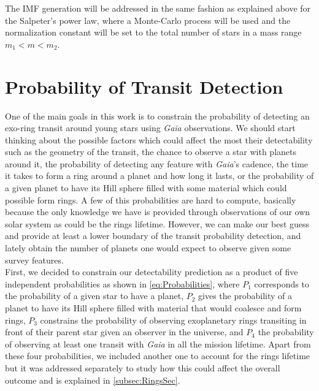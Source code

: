 The IMF generation will be addressed in the same fashion as explained above for the Salpeter's power law, where a Monte-Carlo process will be used and the normalization constant will be set to the total number of stars in a mass range $m_1 < m < m_2$. 

\section{Probability of Transit Detection}


One of the main goals in this work is to constrain the probability of detecting an exo-ring transit around young stars using \textit{Gaia} observations. We should start thinking about the possible factors which could affect the most their detectability such as the geometry of the transit, the chance to observe a star with planets around it, the probability of detecting any feature with \textit{Gaia}'s cadence, the time it takes to form a ring around a planet and how long it lasts, or the probability of a given planet to have its Hill sphere filled with some material which could possible form rings. A few of this probabilities are hard to compute, basically because the only knowledge we have is provided through observations of our own solar system as could be the rings lifetime. However, we can make our best guess and provide at least a lower boundary of the transit probability detection, and lately obtain the number of planets one would expect to observe given some survey features.\\

First, we decided to constrain our detectability prediction as a product of five independent probabilities  as shown in \autoref{eq:Probabilities}, where $P_1$ corresponds to the probability of a given star to have a planet, $P_2$ gives the probability of a planet to have its Hill sphere filled with material that would coalesce and form rings, $P_3$ constrains the probability of observing exoplanetary rings transiting in front of their parent star given an observer in the universe, and $P_4$ the probability of observing at least one transit with \textit{Gaia} in all the mission lifetime. Apart from these four probabilities, we included another one to account for the rings lifetime but it was addressed separately to study how this could affect the overall outcome and is explained in \autoref{subsec:RingsSec}.\\

